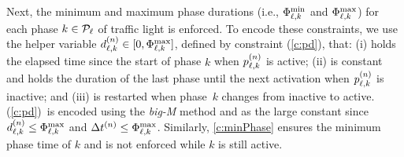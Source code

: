 Next, the minimum and maximum phase durations (i.e.,
$\PTMIN{\ell}{k}$ and $\PTMAX{\ell}{k}$) for each phase $k \in \Pset_\tl$ of
traffic light \tl is enforced.
%
To encode these constraints, we use the helper variable $\pd{\ell}{k} \in
[0,\PTMAX{\ell}{k}]$, defined by constraint (\ref{c:pd}), that:
%
(i) holds the elapsed time since the start of phase $k$ when $\p[n]{\ell}{k}$ is
active; %
%
(ii) is constant and holds the duration of the last phase until the next
activation when $\p[n]{\ell}{k}$ is
inactive; and %
%
(iii) is restarted when phase~$k$ changes from inactive to
active. %
%
%
%
(\ref{c:pd})~is encoded using the \textit{big-M} method and  as
the large constant since $\pd[n]{\ell}{k} \le \PTMAX{\ell}{k}$ and $\DT[n] \le
\PTMAX{\ell}{k}$.
%
Similarly, \cref{c:minPhase} ensures the minimum phase time of $k$ and is
not enforced while $k$ is still active.
%
%
%

